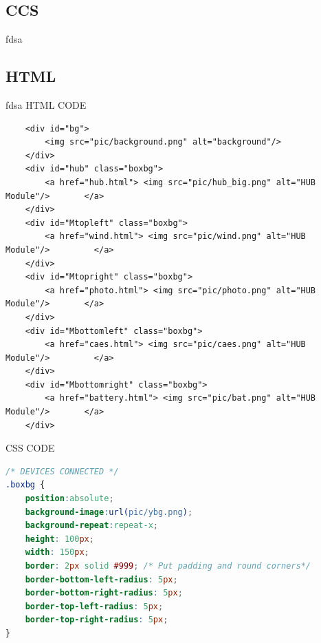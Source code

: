 \subsection{CCS}
fdsa
\subsection{HTML}
fdsa
\newpage
HTML CODE
\begin{lstlisting}
   	<div id="bg">
    	<img src="pic/background.png" alt="background"/>
	</div>
	<div id="hub" class="boxbg">
    	<a href="hub.html"> <img src="pic/hub_big.png" alt="HUB Module"/> 		</a>
    </div>
    <div id="Mtopleft" class="boxbg">
    	<a href="wind.html"> <img src="pic/wind.png" alt="HUB Module"/> 		</a>
    </div>
    <div id="Mtopright" class="boxbg">
    	<a href="photo.html"> <img src="pic/photo.png" alt="HUB Module"/> 		</a>
    </div>
    <div id="Mbottomleft" class="boxbg">
    	<a href="caes.html"> <img src="pic/caes.png" alt="HUB Module"/> 		</a>
    </div>
    <div id="Mbottomright" class="boxbg">
    	<a href="battery.html"> <img src="pic/bat.png" alt="HUB Module"/> 		</a>
    </div>

\end{lstlisting}
CSS CODE
\begin{lstlisting}[language=CSS] 
/* DEVICES CONNECTED */
.boxbg {
	position:absolute;
	background-image:url(pic/ybg.png);
	background-repeat:repeat-x;
	height: 100px;
	width: 150px;
	border: 2px solid #999;	/* Put padding and round corners*/
	border-bottom-left-radius: 5px;
	border-bottom-right-radius: 5px;
	border-top-left-radius: 5px;
	border-top-right-radius: 5px;
}
\end{lstlisting}